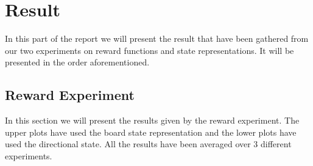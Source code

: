 \documentclass[result.tex]{subfiles}
\begin{document}
    \section*{\centering Result}

    In this part of the report we will present the result that have been gathered from our two experiments on reward functions and state representations. It will be presented in the order aforementioned.

    \subsection*{Reward Experiment}

    In this section we will present the results given by the reward experiment. The upper plots have used the board state representation and the lower plots have used the directional state. All the results have been averaged over 3 different experiments.
\end{document}
